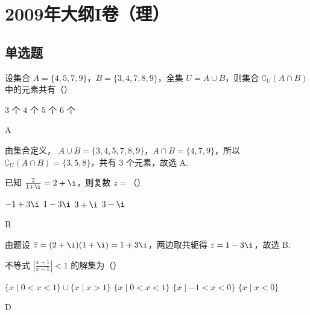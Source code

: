 \chapter{2009年大纲I卷（理）}

\section{单选题}

\begin{problem}
设集合 \(A = \{4, 5, 7, 9\}\)，\(B = \{3, 4, 7, 8, 9\}\)，全集 \(U = A \cup B\)，则集合 \(\complement_U\left(A \cap B\right)\) 中的元素共有（\quad）

\choices
    {\(3\text{ 个}\)}
    {\(4\text{ 个}\)}
    {\(5\text{ 个}\)}
    {\(6\text{ 个}\)}
\end{problem}

\begin{answer}
A
\end{answer}

\begin{solution}
由集合定义，
\(A\cup B=\{3,4,5,7,8,9\}\)，\(A\cap B=\{4,7,9\}\)，所以
\(\complement_U\left(A\cap B\right)=\{3,5,8\}\)，共有 \(3\) 个元素，故选 A.
\end{solution}

\begin{problem}
已知 \(\frac{\overline{z}}{1 + \i} = 2 + \i\)，则复数 \(z =\)（\quad）

\choices
    {\(-1 + 3\i\)}
    {\(1 - 3\i\)}
    {\( 3 + \i \)}
    {\(3 - \i\)}
\end{problem}

\begin{answer}
B
\end{answer}

\begin{solution}
由题设
\(\overline{z}=(2+\i)(1+\i)=1+3\i\)，两边取共轭得
\(z=1-3\i\)，故选 B.
\end{solution}

\begin{problem}
不等式 \(\left|\frac{x + 1}{x - 1}\right| < 1\) 的解集为（\quad）

\choices
    {\(\{x\mid 0 < x < 1\} \cup \{x\mid x > 1\}\)}
    {\(\{x\mid 0 < x < 1\}\)}
    {\(\{x\mid -1 < x < 0\}\)}
    {\(\{x\mid x < 0\}\)}
\end{problem}

\begin{answer}
D
\end{answer}

